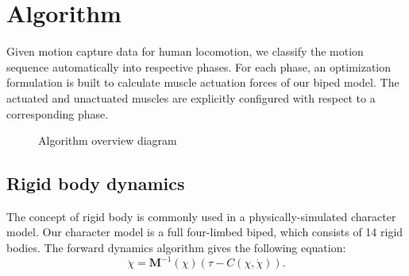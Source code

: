 \documentclass{acm_proc_article-sp}
\begin{document}
\section{Algorithm}

Given motion capture data for human locomotion, we classify the motion
sequence automatically into respective phases. For each phase,
an optimization formulation is built to calculate muscle actuation forces
of our biped model. The actuated and unactuated muscles are explicitly configured
with respect to a corresponding phase.

\begin{figure}[h!]
  \centering
  \caption{Algorithm overview diagram}
\end{figure}


\subsection{Rigid body dynamics}

The concept of rigid body is commonly used in a physically-simulated
character model.
Our character model is a full four-limbed biped, which consists of 14 rigid bodies.
The forward dynamics algorithm gives the following equation:
\begin{equation}
\ddot\chi =\mathbf{M}^{-1}(\chi) ( \tau - C(\chi,\dot\chi) ).
\end{equation}
\end{document}

